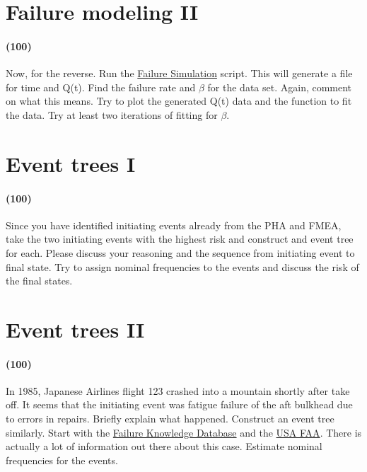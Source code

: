 \documentclass[11pt,a4paper]{article}
\begin{document}
\newpage

\section{Failure modeling II}
\paragraph*{(100)}
Now, for the reverse. Run the \href{https://github.com/TheDoctorRAB/education/tree/master/src}{Failure Simulation} script. This will generate a file for time and Q(t). Find the failure rate and $\beta$ for the data set. Again, comment on what this means. Try to plot the generated Q(t) data and the function to fit the data. Try at least two iterations of fitting for $\beta$.





\newpage

\section{Event trees I}
\paragraph*{(100)}
Since you have identified initiating events already from the PHA and FMEA, take the two initiating events with the highest risk and construct and event tree for each. Please discuss your reasoning and the sequence from initiating event to final state.  Try to assign nominal frequencies to the events and discuss the risk of the final states.
       




\newpage

\section{Event trees II}
\paragraph*{(100)}
In 1985, Japanese Airlines flight 123 crashed into a mountain shortly after take off. It seems that the initiating event was fatigue failure of the aft bulkhead due to errors in repairs. Briefly explain what happened. Construct an event tree similarly. Start with the \href{http://www.shippai.org/fkd/en/cfen/CB1071008.html}{Failure Knowledge Database} and the \href{https://lessonslearned.faa.gov/ll_adsearch_results.cfm?TabID=5}{USA FAA}. There is actually a lot of information out there about this case. Estimate nominal frequencies for the events.
       
\end{document}
